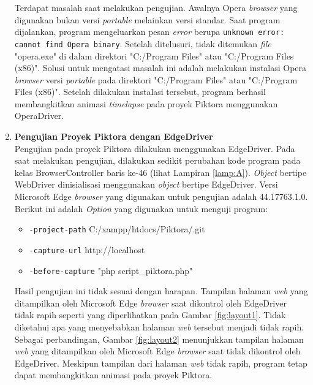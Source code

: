 \begin{enumerate}
Terdapat masalah saat melakukan pengujian. Awalnya Opera \textit{browser} yang digunakan bukan versi \textit{portable} melainkan versi standar. Saat program dijalankan, program mengeluarkan pesan \textit{error} berupa \texttt{unknown error: cannot find Opera binary}. Setelah ditelusuri, tidak ditemukan \textit{file} "opera.exe" di dalam direktori "C:/Program Files" atau "C:/Program Files (x86)". Solusi untuk mengatasi masalah ini adalah melakukan instalasi Opera \textit{browser} versi \textit{portable} pada direktori "C:/Program Files" atau "C:/Program Files (x86)". Setelah dilakukan instalasi tersebut, program berhasil membangkitkan animasi \textit{timelapse} pada proyek Piktora menggunakan OperaDriver.

\item \textbf{Pengujian Proyek Piktora dengan EdgeDriver}\\
Pengujian pada proyek Piktora dilakukan menggunakan EdgeDriver. Pada saat melakukan pengujian, dilakukan sedikit perubahan kode program pada kelas BrowserController baris ke-46 (lihat Lampiran \ref{lamp:A}). \textit{Object} bertipe WebDriver dinisialisasi menggunakan \textit{object} bertipe EdgeDriver. Versi Microsoft Edge \textit{browser} yang digunakan untuk pengujian adalah 44.17763.1.0. Berikut ini adalah \textit{Option} yang digunakan untuk menguji program:
\begin{itemize}
\item \texttt{-project-path} C:/xampp/htdocs/Piktora/.git
\item \texttt{-capture-url} http://localhost
\item \texttt{-before-capture} "php script\_piktora.php"
\end{itemize}
Hasil pengujian ini tidak sesuai dengan harapan. Tampilan halaman \textit{web} yang ditampilkan oleh Microsoft Edge \textit{browser} saat dikontrol oleh EdgeDriver tidak rapih seperti yang diperlihatkan pada Gambar \ref{fig:layout1}. Tidak diketahui apa yang menyebabkan halaman \textit{web} tersebut menjadi tidak rapih. Sebagai perbandingan, Gambar \ref{fig:layout2} menunjukkan tampilan halaman \textit{web} yang ditampilkan oleh Microsoft Edge \textit{browser} saat tidak dikontrol oleh EdgeDriver. Meskipun tampilan dari halaman \textit{web} tidak rapih, program tetap dapat membangkitkan animasi pada proyek Piktora.    


\end{enumerate}

